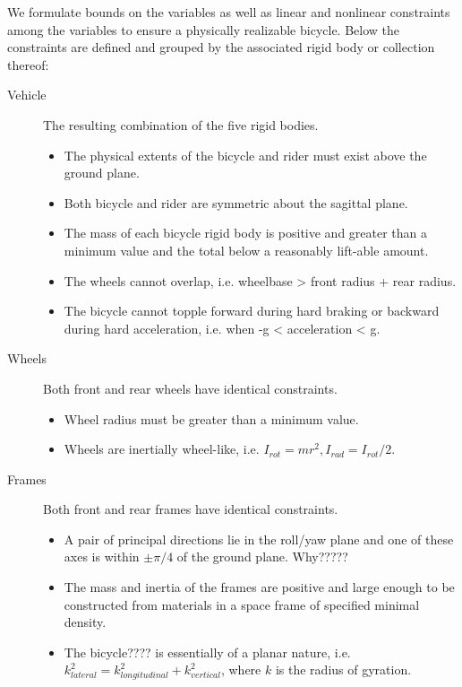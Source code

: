 \documentclass{bmd2019a}
\begin{document}
We formulate bounds on the variables as well as linear and nonlinear
constraints among the variables to ensure a physically realizable bicycle.
Below the constraints are defined and grouped by the associated rigid body or
collection thereof:
%
\begin{description}

  \item[Vehicle] The resulting combination of the five rigid bodies.
    \begin{itemize}
      \itemsep0em
      \item The physical extents of the bicycle and rider must exist above the
        ground plane.
      \item Both bicycle and rider are symmetric about the sagittal
        plane.
      \item The mass of each bicycle rigid body is positive and greater than a
        minimum value and the total below a reasonably lift-able amount.
      \item The wheels cannot overlap, i.e. wheelbase > front radius + rear
        radius.
      \item The bicycle cannot topple forward during hard braking or backward
        during hard acceleration, i.e. when -g < acceleration < g.
    \end{itemize}

  \item[Wheels] Both front and rear wheels have identical constraints.
    \begin{itemize}
      \itemsep0em
      \item Wheel radius must be greater than a minimum value.
      \item Wheels are inertially wheel-like, i.e.
        $I_{rot}=mr^2, I_{rad}=I_{rot}/2$.
    \end{itemize}

  \item[Frames] Both front and rear frames have identical constraints.
    \begin{itemize}
      \itemsep0em
      \item A pair of principal directions lie in the roll/yaw
        plane and one of these axes is within $\pm \pi/4$ of the ground plane.   Why?????
      \item The mass and inertia of the frames are positive and
        large enough to be constructed from materials in a space frame
        of specified minimal density.
      \item The bicycle???? is essentially of a planar nature, i.e.
        $k_{lateral}^2=k_{longitudinal}^2+k_{vertical}^2$, where $k$ is the
        radius of gyration.
    \end{itemize}


\end{description}
\end{document}
